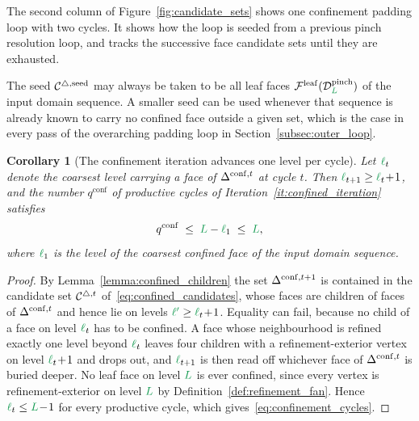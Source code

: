 \documentclass[a4paper, 12pt]{article}
\makeatletter
\DeclareRobustCommand{\candF}[1][]{\mathcal{C}^{\triangle\ifx\@empty#1\@empty\else,#1\fi}}
\newcommand{\green}{\color{ForestGreen}}
\newcommand{\F}{\mathcal{F}}
\DeclareRobustCommand{\simplexsubsetTwo}[2][]{\Delta\ifx\@empty#1\@empty\else^{#1}\fi_{#2}}
\renewcommand{\l}{{\green\ell}}
\renewcommand{\L}{{\green L}}
\newcommand{\lone}{{\green {\l'}  }}
\newtheorem{corollary}[theorem]{Corollary}
\theoremstyle{definition}
\theoremstyle{plain}
\numberwithin{equation}{section}
\newcommand{\tobecut}[1]{{\color{red} #1}}     %
\DeclareRobustCommand{\domseq}[1][]{\mathcal{D}\ifx\@empty#1\@empty\else_{#1}\fi}
\newcommand{\leafMesh}{\F^{\mathrm{leaf}}}                  %
\makeatother
\begin{document}
The second column of Figure~\ref{fig:candidate_sets} shows one confinement padding loop with two cycles. It shows how the loop is seeded from a previous pinch resolution loop, and tracks the successive face candidate sets until they are exhausted.

\tobecut{The seed $\candF[\mathrm{seed}]$ may always be taken to be all leaf faces $\leafMesh(\domseq[\L]^{\mathrm{pinch}})$ of the input domain sequence. A smaller seed can be used whenever that sequence is already known to carry no confined face outside a given set, which is the case in every pass of the overarching padding loop in Section~\ref{subsec:outer_loop}.}

\begin{corollary}[The confinement iteration advances one level per cycle]
    \label{cor:confinement_cycles}
    Let $\l_t$ denote the coarsest level carrying a face of $\simplexsubsetTwo[\mathrm{conf},t]{}$ at cycle $t$. Then $\l_{t+1} \geq \l_t \! + \! 1$, and the number $q^{\mathrm{conf}}$ of productive cycles of Iteration~\ref{it:confined_iteration} satisfies
    \begin{equation}
        \label{eq:confinement_cycles}
        q^{\mathrm{conf}} \; \leq \; \L - \l_1 \; \leq \; \L,
    \end{equation}
    where $\l_1$ is the level of the coarsest confined face of the input domain sequence.
\end{corollary}
\begin{proof}
    By Lemma~\ref{lemma:confined_children} the set $\simplexsubsetTwo[\mathrm{conf},t+1]{}$ is contained in the candidate set $\candF[t]$ of~\eqref{eq:confined_candidates}, whose faces are children of faces of $\simplexsubsetTwo[\mathrm{conf},t]{}$ and hence lie on levels $\lone \geq \l_t \! + \! 1$. Equality can fail, because no child of a face on level $\l_t$ has to be confined. A face whose neighbourhood is refined exactly one level beyond $\l_t$ leaves four children with a refinement-exterior vertex on level $\l_t \! + \! 1$ and drops out, and $\l_{t+1}$ is then read off whichever face of $\simplexsubsetTwo[\mathrm{conf},t]{}$ is buried deeper. No leaf face on level $\L$ is ever confined, since every vertex is refinement-exterior on level $\L$ by Definition~\ref{def:refinement_fan}. Hence $\l_t \leq \L \! - \! 1$ for every productive cycle, which gives~\eqref{eq:confinement_cycles}.
\end{proof}
\end{document}
